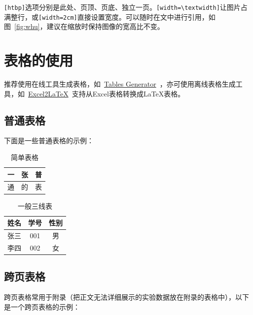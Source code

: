 \verb|[htbp]|选项分别是此处、页顶、页底、独立一页。\verb|[width=\textwidth]|让图片占满整行，或\verb|[width=2cm]|直接设置宽度。可以随时在文中进行引用，如图~\ref{fig:whu}，建议在缩放时保持图像的宽高比不变。

\section{表格的使用}

推荐使用在线工具生成表格，如~\href{https://www.tablesgenerator.com/}{Tables Generator}~，亦可使用离线表格生成工具，如~\href{https://ctan.org/pkg/excel2latex}{Excel2LaTeX}~支持从Excel表格转换成\LaTeX{}表格。

\subsection{普通表格}
下面是一些普通表格的示例：

\begin{table}[ht]
  \centering
  \caption{简单表格}
  \label{tab:1}
  \begin{tabular}{|l|c|r|}
    \hline
    一 & 张 & 普\\
    \hline
    通 & 的 & 表\\
    \hline
  \end{tabular}
\end{table}

\begin{table}[ht]
  \centering
  \caption{一般三线表}
  \label{tab:2}
  \begin{tabular}{ccc}
    \hline
    姓名& 学号& 性别\\
    \hline
    张三& 001& 男\\
    李四& 002& 女\\
    \hline
  \end{tabular}
\end{table}

\subsection{跨页表格}
跨页表格常用于附录（把正文无法详细展示的实验数据放在附录的表格中），以下是一个跨页表格的示例：

